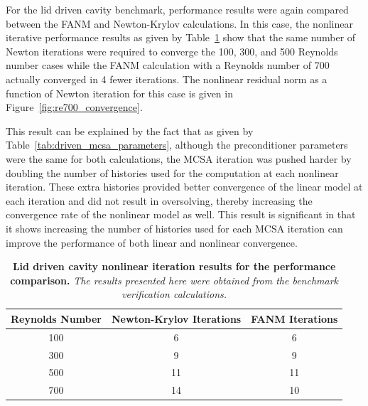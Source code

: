 For the lid driven cavity benchmark, performance results were again
compared between the FANM and Newton-Krylov calculations. In this
case, the nonlinear iterative performance results as given by
Table~\ref{tab:driven_nonlinear_iter_comparison} show that the same
number of Newton iterations were required to converge the 100, 300,
and 500 Reynolds number cases while the FANM calculation with a
Reynolds number of 700 actually converged in 4 fewer iterations. The
nonlinear residual norm as a function of Newton iteration for this
case is given in Figure~\ref{fig:re700_convergence}.

This result can be explained by the fact that as given by
Table~\ref{tab:driven_mcsa_parameters}, although the preconditioner
parameters were the same for both calculations, the MCSA iteration was
pushed harder by doubling the number of histories used for the
computation at each nonlinear iteration. These extra histories
provided better convergence of the linear model at each iteration and
did not result in oversolving, thereby increasing the convergence rate
of the nonlinear model as well. This result is significant in that it
shows increasing the number of histories used for each MCSA iteration
can improve the performance of both linear and nonlinear convergence.

\begin{table}[h!]
  \begin{center}
    \begin{tabular}{ccc}\hline\hline
      \multicolumn{1}{c}{Reynolds Number}& 
      \multicolumn{1}{c}{Newton-Krylov Iterations}&
      \multicolumn{1}{c}{FANM Iterations}\\
      \hline
      100 & 6 & 6 \\
      300 & 9 & 9 \\
      500 & 11 & 11 \\
      700 & 14 & 10 \\
      \hline\hline
    \end{tabular}
  \end{center}
  \caption{\textbf{Lid driven cavity nonlinear iteration
      results for the performance comparison.} \textit{The results
      presented here were obtained from the benchmark verification
      calculations.}}
  \label{tab:driven_nonlinear_iter_comparison}
\end{table}

